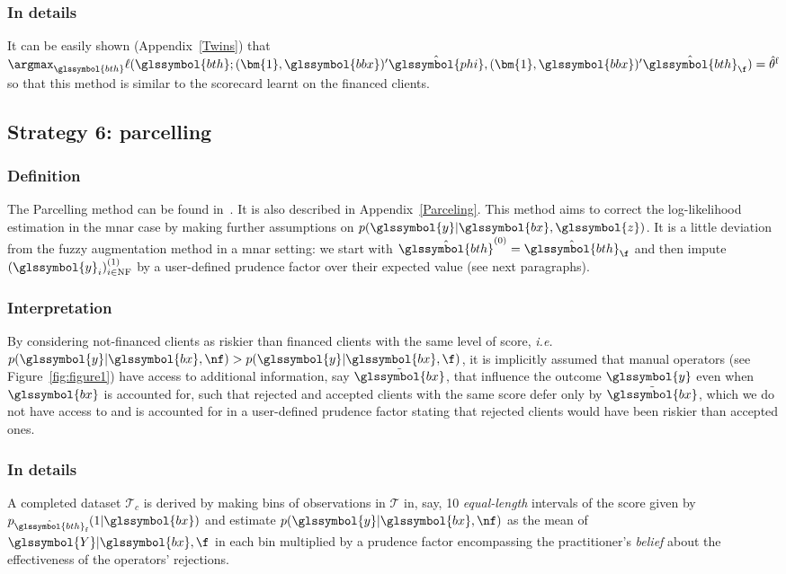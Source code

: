 \subsubsection{In details}
It can be easily shown (Appendix~\ref{Twins}) that $\argmax_{\glssymbol{bth}} \ell(\glssymbol{bth};(\bm{1},\glssymbol{bbx})' \hat{\glssymbol{phi}}, (\bm{1},\glssymbol{bbx})' \hat{\glssymbol{bth}}_\f) = \hat{\theta}^{\text{f}}$ so that this method is similar to the scorecard learnt on the financed clients.

\subsection{Strategy 6: parcelling} \label{subsec:parcel}

\subsubsection{Definition}
The Parcelling method can be found in~\cite{saporta,banasik,RI6}. It is also described in Appendix~\ref{Parceling}. This method aims to correct the log-likelihood estimation in the \gls{mnar} case by making further assumptions on $p(\glssymbol{y} | \glssymbol{bx}, \glssymbol{z})$. It is a little deviation from the fuzzy augmentation method in a \gls{mnar} setting: we start with $\hat{\glssymbol{bth}}^{(0)} = \hat{\glssymbol{bth}}_\f$ and then impute $(\glssymbol{y}_i)_{i \in \text{NF}}^{(1)}$ by a user-defined prudence factor over their expected value (see next paragraphs).

\subsubsection{Interpretation}
By considering not-financed clients as riskier than financed clients with the same level of \gls{score}, \textit{i.e.}\ $p(\glssymbol{y} | \glssymbol{bx}, \nf) > p(\glssymbol{y} | \glssymbol{bx}, \f)$, it is implicitly assumed that manual operators (see Figure~\ref{fig:figure1}) have access to additional information, say $\tilde{\glssymbol{bx}}$, that influence the outcome $\glssymbol{y}$ even when $\glssymbol{bx}$ is accounted for, such that rejected and accepted clients with the same \gls{score} defer only by $\tilde{\glssymbol{bx}}$, which we do not have access to and is accounted for in a user-defined prudence factor stating that rejected clients would have been riskier than accepted ones.

\subsubsection{In details}
A completed dataset $\mathcal{T}_c$ is derived by making bins of observations in $\mathcal{T}$ in, say, 10 \textit{equal-length} intervals of the \gls{score} given by $p_{\hat{\glssymbol{bth}}_\text{f}}(1 | \glssymbol{bx})$ and estimate $p(\glssymbol{y} | \glssymbol{bx}, \nf)$ as the mean of $\glssymbol{Y} | \glssymbol{bx}, \f$ in each bin multiplied by a prudence factor encompassing the practitioner's \textit{belief} about the effectiveness of the operators' rejections.

